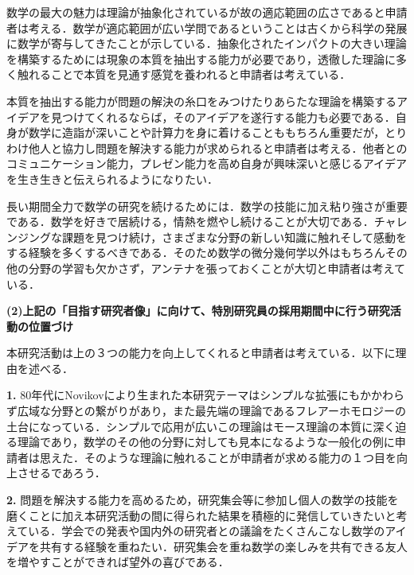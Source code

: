 \documentclass[11pt,a4j,dvipdfmx]{jarticle} 					%
\newcommand{\研究課題名}{象の卵}
\newcommand{\研究機関名}{京都大学}
\newcommand{\研究代表者氏名}{福士謙二}
\begin{document}
\noindent
{}

数学の最大の魅力は理論が抽象化されているが故の適応範囲の広さであると申請者は考える．数学が適応範囲が広い学問であるということは古くから科学の発展に数学が寄与してきたことが示している．抽象化されたインパクトの大きい理論を構築するためには現象の本質を抽出する能力が必要であり，透徹した理論に多く触れることで本質を見通す感覚を養われると申請者は考えている．


\noindent
{}

本質を抽出する能力が問題の解決の糸口をみつけたりあらたな理論を構築するアイデアを見つけてくれるならば，そのアイデアを遂行する能力も必要である．自身が数学に造詣が深いことや計算力を身に着けることももちろん重要だが，とりわけ他人と協力し問題を解決する能力が求められると申請者は考える．他者とのコミュニケーション能力，プレゼン能力を高め自身が興味深いと感じるアイデアを生き生きと伝えられるようになりたい．


\noindent
{}

長い期間全力で数学の研究を続けるためには．数学の技能に加え粘り強さが重要である．数学を好きで居続ける，情熱を燃やし続けることが大切である．チャレンジングな課題を見つけ続け，さまざまな分野の新しい知識に触れそして感動をする経験を多くするべきである．そのため数学の微分幾何学以外はもちろんその他の分野の学習も欠かさず，アンテナを張っておくことが大切と申請者は考えている．


\vspace{5mm}
\noindent
\textbf{(2)上記の「目指す研究者像」に向けて、特別研究員の採用期間中に行う研究活動の位置づけ}



本研究活動は上の３つの能力を向上してくれると申請者は考えている．以下に理由を述べる．


\noindent\textbf{1. }80年代にNovikovにより生まれた本研究テーマはシンプルな拡張にもかかわらず広域な分野との繋がりがあり，また最先端の理論であるフレアーホモロジーの土台になっている．シンプルで応用が広いこの理論はモース理論の本質に深く迫る理論であり，数学のその他の分野に対しても見本になるような一般化の例に申請者は思えた．そのような理論に触れることが申請者が求める能力の１つ目を向上させるであろう．


\noindent\textbf{2. }問題を解決する能力を高めるため，研究集会等に参加し個人の数学の技能を磨くことに加え本研究活動の間に得られた結果を積極的に発信していきたいと考えている．学会での発表や国内外の研究者との議論をたくさんこなし数学のアイデアを共有する経験を重ねたい．研究集会を重ね数学の楽しみを共有できる友人を増やすことができれば望外の喜びである．
\end{document}
